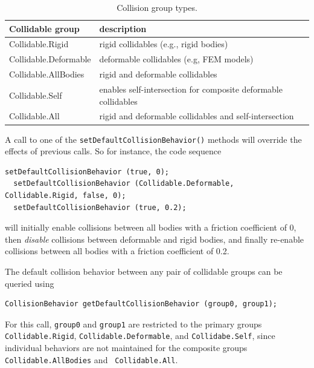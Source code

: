 \begin{table}[h]
\begin{center}
\begin{tabular}{|ll|}
\hline
Collidable group & description \\
\hline
Collidable.Rigid & rigid collidables (e.g., rigid bodies) \\
Collidable.Deformable & deformable collidables (e.g, FEM models) \\
Collidable.AllBodies & rigid and deformable collidables \\
Collidable.Self & enables self-intersection
for composite deformable collidables\\
Collidable.All & rigid and deformable collidables and self-intersection\\
\hline
\end{tabular}
\end{center}
\caption{Collision group types.}
\label{CollisionGroups:tab}
\end{table}

A call to one of the {\tt setDefaultCollisionBehavior()} methods will
override the effects of previous calls. So for instance, the code
sequence
%
\begin{lstlisting}[]
  setDefaultCollisionBehavior (true, 0);
  setDefaultCollisionBehavior (Collidable.Deformable, Collidable.Rigid, false, 0);
  setDefaultCollisionBehavior (true, 0.2);
\end{lstlisting}
%
will initially enable collisions between all bodies with a friction
coefficient of 0, then {\it disable} collisions between deformable and
rigid bodies, and finally re-enable collisions between all bodies with
a friction coefficient of 0.2.

The default collision behavior between any pair of collidable groups can
be queried using
%
\begin{lstlisting}[]
  CollisionBehavior getDefaultCollisionBehavior (group0, group1);
\end{lstlisting}
%
For this call, {\tt group0} and {\tt group1} are restricted to the
primary groups {\tt Collidable.Rigid}, {\tt Collidable.Deformable},
and {\tt Collidabe.Self}, since individual behaviors are not
maintained for the composite groups {\tt Collidable.AllBodies} and {\tt
Collidable.All}.

